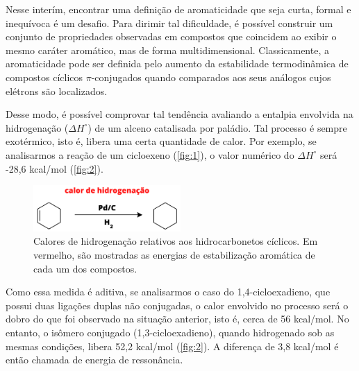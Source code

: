 Nesse interím, encontrar uma definição de aromaticidade que seja curta, formal e inequívoca é um desafio. Para dirimir tal dificuldade, é possível construir um conjunto de propriedades observadas em compostos que coincidem ao exibir o mesmo caráter aromático, mas de forma multidimensional. Classicamente, a aromaticidade pode ser definida pelo aumento da estabilidade termodinâmica de compostos cíclicos $\pi$-conjugados quando comparados aos seus análogos cujos elétrons são localizados.

Desse modo, é possível comprovar tal tendência avaliando a entalpia envolvida na hidrogenação ($\Delta H^\circ$) de um alceno catalisada por paládio. Tal processo é sempre exotérmico, isto é, libera uma certa quantidade de calor. Por exemplo, se analisarmos a reação de um cicloexeno (\autoref{fig:1}), o valor numérico do $\Delta H^\circ$ será -28,6 kcal/mol (\autoref{fig:2}). 


\begin{figure}[htb]
	\caption{\label{fig:1} Calores de hidrogenação relativos aos hidrocarbonetos cíclicos. Em vermelho, são mostradas as energias de estabilização aromática de cada um dos compostos.}
	\begin{center}
		\includegraphics[width=0.5\textwidth]{images/fig1.png}
	\end{center}
\end{figure}

Como essa medida é aditiva, se analisarmos o caso do 1,4-cicloexadieno, que possui duas ligações duplas não conjugadas, o calor envolvido no processo será o dobro do que foi observado na situação anterior, isto é, cerca de 56 kcal/mol. No entanto, o isômero conjugado (1,3-cicloexadieno), quando hidrogenado sob as mesmas condições, libera 52,2 kcal/mol (\autoref{fig:2}). A diferença de 3,8 kcal/mol é então chamada de energia de ressonância.

